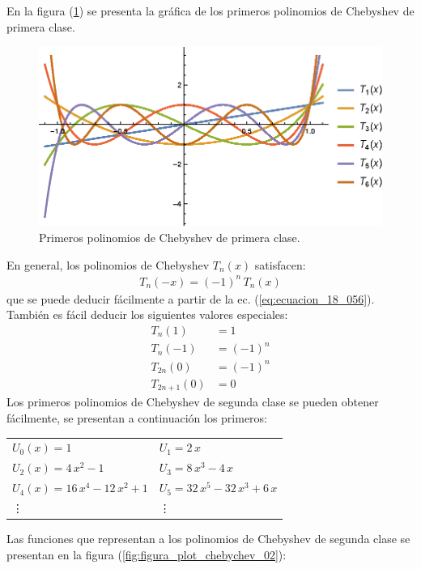 \documentclass[12pt]{article}
\numberwithin{equation}{section}
\begin{document}
En la figura (\ref{fig:figura_plot_chebychev_01}) se presenta la gráfica de los primeros polinomios de Chebyshev de primera clase.
\begin{figure}[H]
    \centering
    \includegraphics[scale=1.2]{Imagenes/Plot_Polinomios_Chebychev_01.eps}
    \caption{Primeros polinomios de Chebyshev de primera clase.}
    \label{fig:figura_plot_chebychev_01}
\end{figure}
En general, los polinomios de Chebyshev $T_{n}(x)$ satisfacen:
\begin{align*}
T_{n}(-x) = (-1)^{n} \, T_{n} (x)
\end{align*}
que se puede deducir fácilmente a partir de la ec. (\ref{eq:ecuacion_18_056}). También es fácil deducir los siguientes valores especiales:
\begin{align*}
T_{n} (1) &= 1 \\[0.5em]
T_{n} (-1) &= (-1)^{n} \\[0.5em]
T_{2n} (0) &= (-1)^{n} \\[0.5em]
T_{2n+1} (0) &= 0
\end{align*}
Los primeros polinomios de Chebyshev de segunda clase se pueden obtener fácilmente, se presentan a continuación los primeros:
\begin{table}[H]
\centering
\fontsize{14}{14}\selectfont
\begin{tabular}{p{6cm} p{6cm}}
$U_{0}(x) = 1$ & $U_{1} = 2 \, x$ \\[0.5em]
$U_{2}(x) = 4 \, x^{2} - 1$ & $U_{3} = 8 \, x^{3} - 4 \, x$ \\[0.5em]
$U_{4}(x) = 16 \, x^{4} - 12 \, x^{2} + 1$ & $U_{5} = 32 \, x^{5} - 32 \, x^{3} + 6 \, x$ \\[0.5em]
\vdots & \vdots
\end{tabular}
\end{table}
Las funciones que representan a los polinomios de Chebyshev de segunda clase se presentan en la figura (\ref{fig:figura_plot_chebychev_02}):
\end{document}
